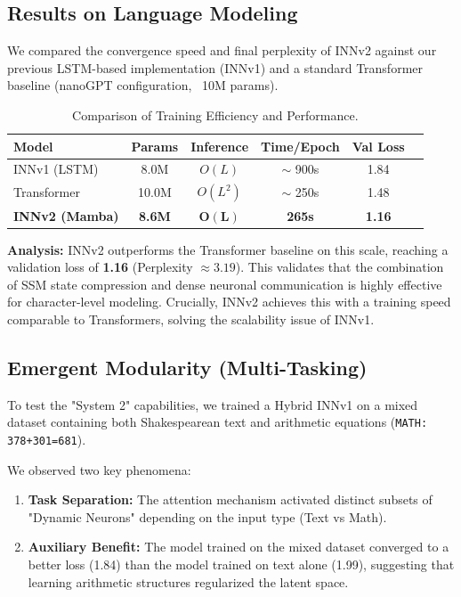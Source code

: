 \documentclass[a4paper,11pt]{article}
\begin{document}
\subsection{Results on Language Modeling}

We compared the convergence speed and final perplexity of INNv2 against our previous LSTM-based implementation (INNv1) and a standard Transformer baseline (nanoGPT configuration, ~10M params).

\begin{table}[h]
    \centering
    \caption{Comparison of Training Efficiency and Performance.}
    \label{tab:results}
    \begin{tabular}{lccccc}
        \toprule
        \textbf{Model} & \textbf{Params} & \textbf{Inference} & \textbf{Time/Epoch} & \textbf{Val Loss} \\
        \midrule
        INNv1 (LSTM) & 8.0M & $O(L)$ & $\sim$ 900s & 1.84 \\
        Transformer & 10.0M & $O(L^2)$ & $\sim$ 250s & 1.48 \\
        \textbf{INNv2 (Mamba)} & \textbf{8.6M} & $\mathbf{O(L)}$ & \textbf{265s} & \textbf{1.16} \\
        \bottomrule
    \end{tabular}
\end{table}

\textbf{Analysis:} INNv2 outperforms the Transformer baseline on this scale, reaching a validation loss of \textbf{1.16} (Perplexity $\approx 3.19$). This validates that the combination of SSM state compression and dense neuronal communication is highly effective for character-level modeling. Crucially, INNv2 achieves this with a training speed comparable to Transformers, solving the scalability issue of INNv1.

\subsection{Emergent Modularity (Multi-Tasking)}

To test the "System 2" capabilities, we trained a Hybrid INNv1 on a mixed dataset containing both Shakespearean text and arithmetic equations (\texttt{MATH: 378+301=681}).

We observed two key phenomena:
\begin{enumerate}
    \item \textbf{Task Separation:} The attention mechanism activated distinct subsets of "Dynamic Neurons" depending on the input type (Text vs Math).
    \item \textbf{Auxiliary Benefit:} The model trained on the mixed dataset converged to a better loss (1.84) than the model trained on text alone (1.99), suggesting that learning arithmetic structures regularized the latent space.
\end{enumerate}
\end{document}
